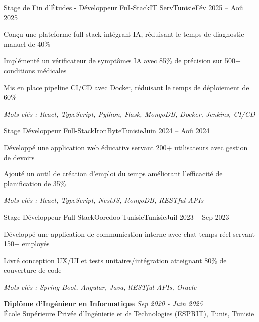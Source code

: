\documentclass[11pt,a4paper]{article}
\begin{document}
\makecvheader
\makecontactinfo


\begin{internship}{Stage de Fin d'Études - Développeur Full-Stack}{IT Serv}{Tunisie}{Fév 2025 -- Aoû 2025}{}
  \item Conçu une plateforme full-stack intégrant IA, réduisant le temps de diagnostic manuel de 40\%
  \item Implémenté un vérificateur de symptômes IA avec 85\% de précision sur 500+ conditions médicales
  \item Mis en place pipeline CI/CD avec Docker, réduisant le temps de déploiement de 60\%
  \item[] \textit{\footnotesize Mots-clés : React, TypeScript, Python, Flask, MongoDB, Docker, Jenkins, CI/CD}
\end{internship}

\begin{internship}{Stage Développeur Full-Stack}{IronByte}{Tunisie}{Juin 2024 -- Aoû 2024}{}
  \item Développé une application web éducative servant 200+ utilisateurs avec gestion de devoirs
  \item Ajouté un outil de création d'emploi du temps améliorant l'efficacité de planification de 35\%
  \item[] \textit{\footnotesize Mots-clés : React, TypeScript, NestJS, MongoDB, RESTful APIs}
\end{internship}

\begin{internship}{Stage Développeur Full-Stack}{Ooredoo Tunisie}{Tunisie}{Juil 2023 -- Sep 2023}{}
  \item Développé une application de communication interne avec chat temps réel servant 150+ employés
  \item Livré conception UX/UI et tests unitaires/intégration atteignant 80\% de couverture de code
  \item[] \textit{\footnotesize Mots-clés : Spring Boot, Angular, Java, RESTful APIs, Oracle}
\end{internship}

\textbf{Diplôme d'Ingénieur en Informatique} \hfill \textit{Sep 2020 - Juin 2025}\\[-2pt]
École Supérieure Privée d'Ingénierie et de Technologies (ESPRIT), Tunis, Tunisie
\end{document}
